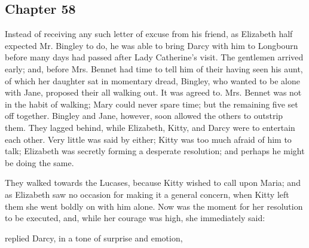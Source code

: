 \subsection[chapter-58]{\useURL[url58][][][]\from[url58] Chapter 58}

Instead of receiving any such letter of excuse from his friend, as Elizabeth half expected Mr. Bingley to do, he was able to bring Darcy with him to Longbourn before many days had passed after Lady Catherine's visit. The gentlemen arrived early; and, before Mrs. Bennet had time to tell him of their having seen his aunt, of which her daughter sat in momentary dread, Bingley, who wanted to be alone with Jane, proposed their all walking out. It was agreed to. Mrs. Bennet was not in the habit of walking; Mary could never spare time; but the remaining five set off together. Bingley and Jane, however, soon allowed the others to outstrip them. They lagged behind, while Elizabeth, Kitty, and Darcy were to entertain each other. Very little was said by either; Kitty was too much afraid of him to talk; Elizabeth was secretly forming a desperate resolution; and perhaps he might be doing the same.

They walked towards the Lucases, because Kitty wished to call upon Maria; and as Elizabeth saw no occasion for making it a general concern, when Kitty left them she went boldly on with him alone. Now was the moment for her resolution to be executed, and, while her courage was high, she immediately said:


 replied Darcy, in a tone of surprise and emotion, 



